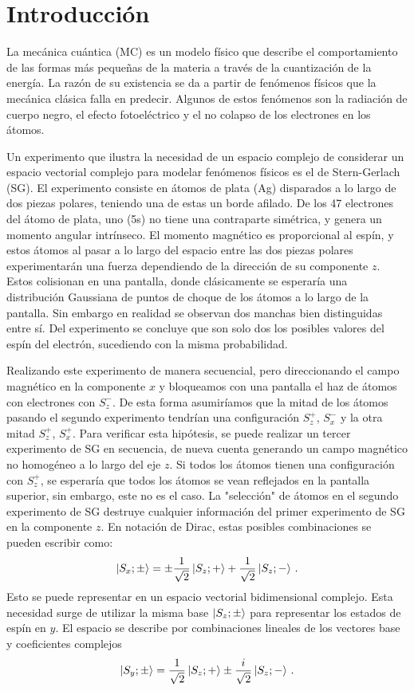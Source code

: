 \chapter{Introducci\'on}

La mecánica cuántica (MC) es un modelo físico que describe el comportamiento de las formas más pequeñas de la materia a través de la cuantización de la energía. La razón de su existencia se da a partir de fenómenos físicos que la mecánica clásica falla en predecir. Algunos de estos fenómenos son la radiación de cuerpo negro, el efecto fotoeléctrico y el no colapso de los electrones en los átomos.

Un experimento que ilustra la necesidad de un espacio complejo de considerar un espacio vectorial complejo para modelar fenómenos físicos es el de Stern-Gerlach (SG). El experimento consiste en átomos de plata (Ag) disparados a lo largo de dos piezas polares, teniendo una de estas un borde afilado. De los 47 electrones del átomo de plata, uno (5s) no tiene una contraparte simétrica, y genera un momento angular intrínseco. El momento magnético es proporcional al espín, y estos átomos al pasar a lo largo del espacio entre las dos piezas polares experimentarán una fuerza dependiendo de la dirección de su componente $z$. Estos colisionan en una pantalla, donde clásicamente se esperaría una distribución Gaussiana de puntos de choque de los átomos a lo largo de la pantalla. Sin embargo en realidad se observan dos manchas bien distinguidas entre sí. Del experimento se concluye que son solo dos los posibles valores del espín del electrón, sucediendo con la misma probabilidad.

Realizando este experimento de manera secuencial, pero direccionando el campo magnético en la componente $x$ y bloqueamos con una pantalla el haz de átomos con electrones con $S_z^-$. De esta forma asumiríamos que la mitad de los átomos pasando el segundo experimento tendrían una configuración $S_z^+$, $S_x^-$ y la otra mitad
$S_z^+$, $S_x^+$. Para verificar esta hipótesis, se puede realizar un tercer experimento de SG en secuencia, de nueva cuenta generando un campo magnético no homogéneo a lo largo del eje $z$. Si todos los átomos tienen una configuración con $S_z^+$, se esperaría que todos los átomos se vean reflejados en la pantalla superior, sin embargo, este no es el caso. La "selección" de átomos en el segundo experimento de SG destruye cualquier información del primer experimento de SG en la componente $z$. En notación de Dirac, estas posibles combinaciones se pueden escribir como:
\begin{equation}
  \label{1.1}
  \ket{S_x; \pm} = \pm \frac{1}{\sqrt{2}}\ket{S_z; +} + \frac{1}{\sqrt{2}}\ket{S_z; -}\,.
\end{equation}
Esto se puede representar en un espacio vectorial bidimensional complejo. Esta necesidad surge de utilizar la misma base $\ket{S_z; \pm}$ para representar los estados de espín en $y$. El espacio se describe por combinaciones lineales de los vectores base y coeficientes complejos
\begin{equation}
  \label{1.2}
  \ket{S_y; \pm} = \frac{1}{\sqrt{2}}\ket{S_z; +} \pm \frac{i}{\sqrt{2}}\ket{S_z; -}\,.
\end{equation}

